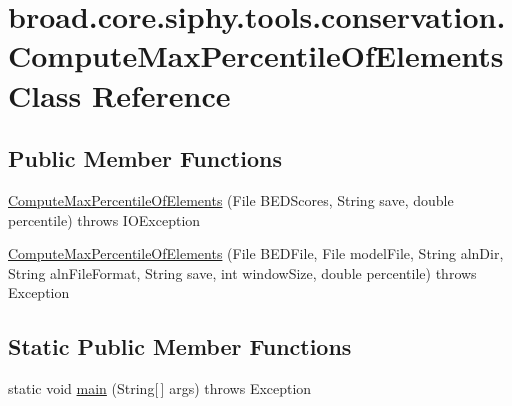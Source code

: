 \hypertarget{classbroad_1_1core_1_1siphy_1_1tools_1_1conservation_1_1_compute_max_percentile_of_elements}{\section{broad.\+core.\+siphy.\+tools.\+conservation.\+Compute\+Max\+Percentile\+Of\+Elements Class Reference}
\label{classbroad_1_1core_1_1siphy_1_1tools_1_1conservation_1_1_compute_max_percentile_of_elements}
}
\subsection*{Public Member Functions}
\begin{DoxyCompactItemize}
\item 
\hyperlink{classbroad_1_1core_1_1siphy_1_1tools_1_1conservation_1_1_compute_max_percentile_of_elements_a8b61f06dabc30bb30e88a05e338de30f}{Compute\+Max\+Percentile\+Of\+Elements} (File B\+E\+D\+Scores, String save, double percentile)  throws I\+O\+Exception
\item 
\hyperlink{classbroad_1_1core_1_1siphy_1_1tools_1_1conservation_1_1_compute_max_percentile_of_elements_a2896c3841f0bd727453ed54bfe1c39b9}{Compute\+Max\+Percentile\+Of\+Elements} (File B\+E\+D\+File, File model\+File, String aln\+Dir, String aln\+File\+Format, String save, int window\+Size, double percentile)  throws Exception
\end{DoxyCompactItemize}
\subsection*{Static Public Member Functions}
\begin{DoxyCompactItemize}
\item 
static void \hyperlink{classbroad_1_1core_1_1siphy_1_1tools_1_1conservation_1_1_compute_max_percentile_of_elements_a505e4a564db2f7eb6207d49594e6bea4}{main} (String\mbox{[}$\,$\mbox{]} args)  throws Exception
\end{DoxyCompactItemize}



